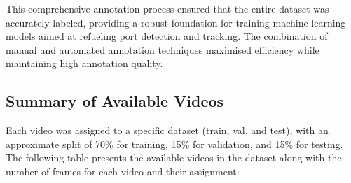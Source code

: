 \documentclass[12pt,oneside]{book} %
\begin{document}
This comprehensive annotation process ensured that the entire dataset was
accurately labeled, providing a robust foundation for training machine learning
models aimed at refueling port detection and tracking. The combination of
manual and automated annotation techniques maximised efficiency while
maintaining high annotation quality.

\subsection{Summary of Available Videos}
Each video was assigned to a specific dataset (train, val, and test), with an
approximate split of 70\% for training, 15\% for validation, and 15\% for
testing. The following table presents the available videos in the dataset along
with the number of frames for each video and their assignment:
\end{document}
